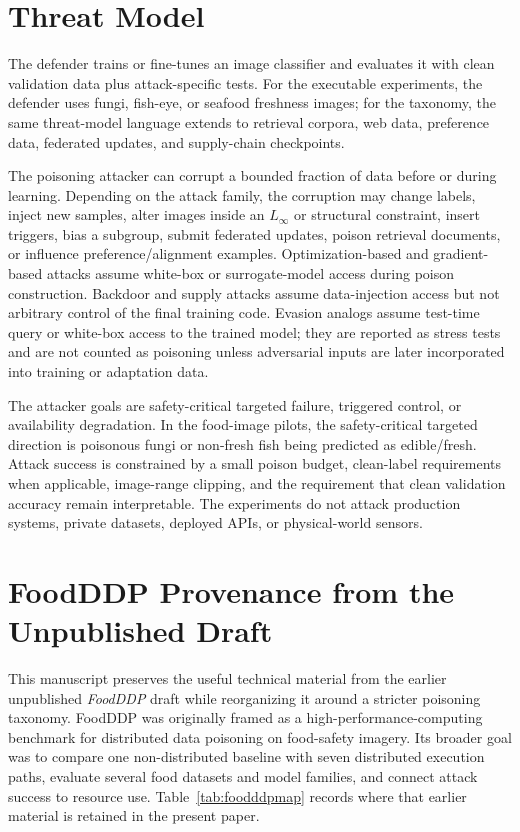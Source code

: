 \documentclass[conference]{IEEEtran}
\begin{document}
\section{Threat Model}

The defender trains or fine-tunes an image classifier and evaluates it with clean validation data plus attack-specific tests. For the executable experiments, the defender uses fungi, fish-eye, or seafood freshness images; for the taxonomy, the same threat-model language extends to retrieval corpora, web data, preference data, federated updates, and supply-chain checkpoints.

The poisoning attacker can corrupt a bounded fraction of data before or during learning. Depending on the attack family, the corruption may change labels, inject new samples, alter images inside an \(L_\infty\) or structural constraint, insert triggers, bias a subgroup, submit federated updates, poison retrieval documents, or influence preference/alignment examples. Optimization-based and gradient-based attacks assume white-box or surrogate-model access during poison construction. Backdoor and supply attacks assume data-injection access but not arbitrary control of the final training code. Evasion analogs assume test-time query or white-box access to the trained model; they are reported as stress tests and are not counted as poisoning unless adversarial inputs are later incorporated into training or adaptation data.

The attacker goals are safety-critical targeted failure, triggered control, or availability degradation. In the food-image pilots, the safety-critical targeted direction is poisonous fungi or non-fresh fish being predicted as edible/fresh. Attack success is constrained by a small poison budget, clean-label requirements when applicable, image-range clipping, and the requirement that clean validation accuracy remain interpretable. The experiments do not attack production systems, private datasets, deployed APIs, or physical-world sensors.

\section{FoodDDP Provenance from the Unpublished Draft}

This manuscript preserves the useful technical material from the earlier unpublished \emph{FoodDDP} draft while reorganizing it around a stricter poisoning taxonomy. FoodDDP was originally framed as a high-performance-computing benchmark for distributed data poisoning on food-safety imagery. Its broader goal was to compare one non-distributed baseline with seven distributed execution paths, evaluate several food datasets and model families, and connect attack success to resource use. Table~\ref{tab:foodddpmap} records where that earlier material is retained in the present paper.
\end{document}
